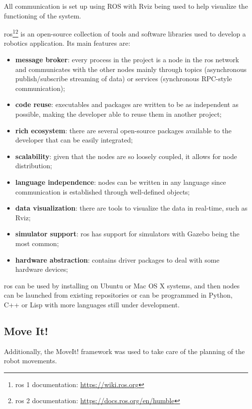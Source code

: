 All communication is set up using ROS with Rviz being used to help visualize the functioning of the system.

\acs{ros}\cite{ROS2}\footnote{\acs{ros} 1 documentation: \url{https://wiki.ros.org}}\footnote{\acs{ros} 2 documentation: \url{https://docs.ros.org/en/humble}} is an open-source collection of tools and software libraries used to develop a robotics application. Its main features are:

\begin{itemize}
    \item \textbf{message broker}: every process in the project is a node in the \acs{ros} network and communicates with the other nodes mainly through topics (asynchronous publish/subscribe streaming of data) or services (synchronous RPC-style communication);
    \item \textbf{code reuse}: executables and packages are written to be as independent as possible, making the developer able to reuse them in another project;
    \item \textbf{rich ecosystem}: there are several open-source packages available to the developer that can be easily integrated;
    \item \textbf{scalability}: given that the nodes are so loosely coupled, it allows for node distribution;
    \item \textbf{language independence}: nodes can be written in any language since communication is established through well-defined objects;
    \item \textbf{data visualization}: there are tools to visualize the data in real-time, such as Rviz;
    \item \textbf{simulator support}: \acs{ros} has support for simulators with Gazebo being the most common;
    \item \textbf{hardware abstraction}: contains driver packages to deal with some hardware devices;
\end{itemize}

\acs{ros} can be used by installing on Ubuntu or Mac OS X systems, and then nodes can be launched from existing repositories or can be programmed in Python, C++ or Lisp with more languages still under development.

\subsection{Move It!}

Additionally, the MoveIt! framework was used to take care of the planning of the robot movements.

